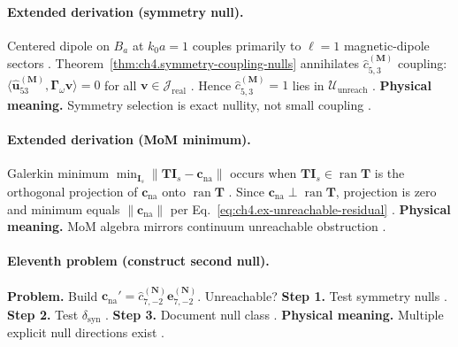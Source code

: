 \paragraph{Extended derivation (symmetry null).}
Centered dipole on \(B_{a}\) at \(k_{0}a=1\) couples primarily to \(\ell=1\) magnetic-dipole sectors \cite{hansen1988,jackson1999,stratton1941,harrington2001}.
Theorem~\ref{thm:ch4.symmetry-coupling-nulls} annihilates \(\widehat{c}_{5,3}^{(\mathbf{M})}\) coupling: \(\langle\widehat{\mathbf{u}}_{53}^{(\mathbf{M})},\boldsymbol{\Gamma}_\omega\mathbf{v}\rangle=0\) for all
\(\mathbf{v}\in\mathcal{J}_{\mathrm{real}}\) \cite{harrington2001,stratton1941,devaney2004,hansen1988}. Hence \(\widehat{c}_{5,3}^{(\mathbf{M})}=1\) lies in
\(\mathcal{U}_{\mathrm{unreach}}\) \cite{devaney2004,jackson1999,harrington2001,stratton1941}.
\textbf{Physical meaning.} Symmetry selection is exact nullity, not small coupling \cite{hansen1988,stratton1941}.

\paragraph{Extended derivation (MoM minimum).}
Galerkin minimum \(\min_{\mathbf{I}_{s}}\|\mathbf{T}\mathbf{I}_{s}-\mathbf{c}_{\mathrm{na}}\|\) occurs when \(\mathbf{T}\mathbf{I}_{s}\in\operatorname{ran}\mathbf{T}\) is the orthogonal projection of
\(\mathbf{c}_{\mathrm{na}}\) onto \(\operatorname{ran}\mathbf{T}\) \cite{harrington2001,stratton1941,devaney2004}. Since \(\mathbf{c}_{\mathrm{na}}\perp\operatorname{ran}\mathbf{T}\), projection is zero and
minimum equals \(\|\mathbf{c}_{\mathrm{na}}\|\) per Eq.~\eqref{eq:ch4.ex-unreachable-residual} \cite{hansen1988,jackson1999,devaney2004,harrington2001,stratton1941}.
\textbf{Physical meaning.} MoM algebra mirrors continuum unreachable obstruction \cite{stratton1941,harrington2001}.

\paragraph{Eleventh problem (construct second null).}
\textbf{Problem.} Build \(\mathbf{c}_{\mathrm{na}}'=\widehat{c}_{7,-2}^{(\mathbf{N})}\mathbf{e}_{7,-2}^{(\mathbf{N})}\). Unreachable?
\textbf{Step 1.} Test symmetry nulls \cite{hansen1988,harrington2001,stratton1941}.
\textbf{Step 2.} Test \(\delta_{\mathrm{syn}}\) \cite{devaney2004,jackson1999}.
\textbf{Step 3.} Document null class \cite{harrington2001,stratton1941,hansen1988}.
\textbf{Physical meaning.} Multiple explicit null directions exist \cite{devaney2004,jackson1999}.

